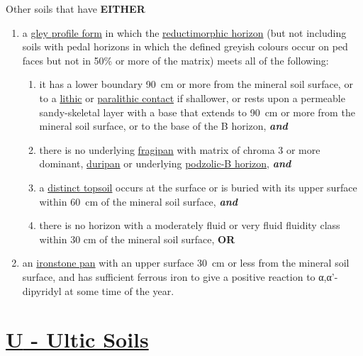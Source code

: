\documentclass[
  letterpaper,
  DIV=11,
  numbers=noendperiod]{scrreprt}
\providecommand{\tightlist}{%
  \setlength{\itemsep}{0pt}\setlength{\parskip}{0pt}}\usepackage{longtable,booktabs,array}
\begin{document}
Other soils that have \textbf{EITHER}

\begin{enumerate}
\def\labelenumi{\arabic{enumi}.}
\tightlist
\item
  a \protect\hyperlink{sec-diag-gleypf}{gley profile form} in which the
  \protect\hyperlink{sec-diag-redmh}{reductimorphic horizon} (but not
  including soils with pedal horizons in which the defined greyish
  colours occur on ped faces but not in 50\% or more of the matrix)
  meets all of the following:

  \begin{enumerate}
  \def\labelenumii{(\alph{enumii})}
  \tightlist
  \item
    it has a lower boundary 90~cm or more from the mineral soil surface,
    or to a \protect\hyperlink{sec-diag-lithc}{lithic} or
    \protect\hyperlink{sec-diag-plith}{paralithic contact} if shallower,
    or rests upon a permeable sandy-skeletal layer with a base that
    extends to 90~cm or more from the mineral soil surface, or to the
    base of the B horizon, \textbf{\emph{and}}
  \item
    there is no underlying \protect\hyperlink{sec-diag-fpan}{fragipan}
    with matrix of chroma 3 or more dominant,
    \protect\hyperlink{sec-diag-dpan}{duripan} or underlying
    \protect\hyperlink{sec-diag-podzb}{podzolic-B horizon},
    \textbf{\emph{and}}
  \item
    a \protect\hyperlink{sec-diag-dts}{distinct topsoil} occurs at the
    surface or is buried with its upper surface within 60~cm of the
    mineral soil surface, \textbf{\emph{and}}
  \item
    there is no horizon with a moderately fluid or very fluid fluidity
    class within 30 cm of the mineral soil surface, \textbf{OR}
  \end{enumerate}
\item
  an \protect\hyperlink{sec-diag-ipan}{ironstone pan} with an upper
  surface 30~cm or less from the mineral soil surface, and has
  sufficient ferrous iron to give a positive reaction to α,α'-dipyridyl
  at some time of the year.
\end{enumerate}

\hypertarget{sec-U}{%
\section{\texorpdfstring{\protect\hyperlink{sec-ord-U}{\textbf{U} -
Ultic Soils}}{U - Ultic Soils}}\label{sec-U}}
\end{document}
